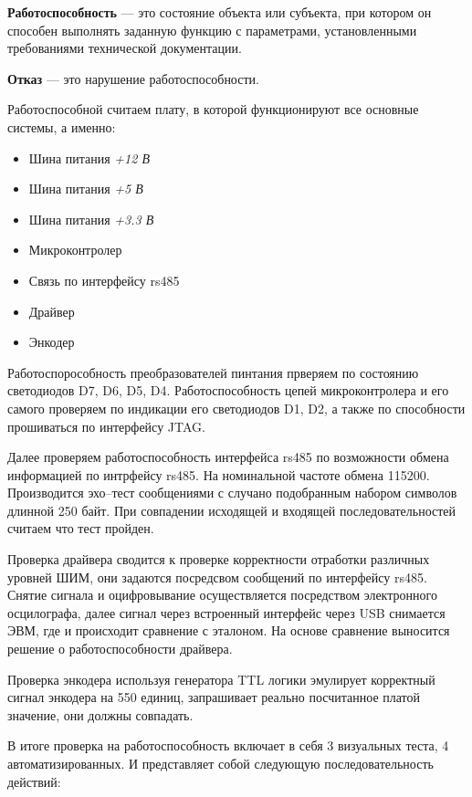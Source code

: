 \textbf{Работоспособность} --- это состояние объекта или субъекта, при котором он
способен выполнять заданную функцию с параметрами, установленными требованиями
технической документации.


\textbf{Отказ} --- это нарушение работоспособности.

Работоспособной считаем плату, в которой функционируют все основные системы,
а именно:
\begin{itemize}
    \item Шина питания \textit{+12 В}
    \item Шина питания \textit{+5 В}
    \item Шина питания \textit{+3.3 В}
    \item Микроконтролер
    \item Связь по интерфейсу rs485
    \item Драйвер
    \item Энкодер
\end{itemize}
Работоспорособность преобразователей пинтания прверяем по состоянию светодиодов
D7, D6, D5, D4. Работоспособность цепей микроконтролера и его самого проверяем
по индикации его светодиодов D1, D2, а также по способности прошиваться по
интерфейсу JTAG.

Далее проверяем работоспособность интерфейса rs485 по
возможности обмена информацией по интрфейсу rs485. На номинальной частоте обмена
115200. Производится эхо--тест сообщениями с случано подобранным набором
символов длинной 250 байт. При совпадении исходящей и входящей
последовательностей считаем что тест пройден.

Проверка драйвера сводится к проверке корректности отработки различных уровней
ШИМ, они задаются посредсвом сообщений по интерфейсу rs485. Снятие сигнала и
оцифровывание осуществляется посредством электронного осцилографа, далее сигнал
через встроенный интерфейс через USB снимается ЭВМ, где и происходит сравнение
с эталоном. На основе сравнение выносится решение о работоспособности драйвера.

Проверка энкодера используя генератора TTL логики эмулирует корректный сигнал
энкодера на 550 единиц, запрашивает реально посчитанное платой значение, они
должны совпадать.

В итоге проверка на работоспособность включает в себя 3 визуальных теста, 4
автоматизированных. И представляет собой следующую последовательность действий:

